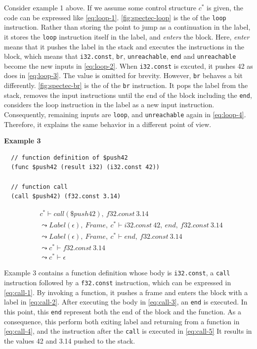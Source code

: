 Consider example 1 above.
If we assume some control structure $c^*$ is given, the code can be expressed
like \cref{eq:loop-1}.
\cref{fig:spectec-loop} is the \spectecp{} of the \texttt{loop} instruction.
Rather than storing the point to jump as a continuation in the label, it stores
the \texttt{loop} instruction itself in the label, and \textit{enters} the
block.
Here, \textit{enter} means that it pushes the label in the stack and executes
the instructions in the block, which means that \texttt{i32.const},
\texttt{br}, \texttt{unreachable}, \texttt{end} and \texttt{unreachable} become
the new inputs in \cref{eq:loop-2}.
When \texttt{i32.const} is excuted, it pushes 42 as \officialp{} does
in \cref{eq:loop-3}.
The value is omitted for brevity.
However, \texttt{br} behaves a bit differently.
\cref{fig:spectec-br} is the \spectecp{} of the \texttt{br} instruction.
It pops the label from the stack, removes the input instructions until the end
of the block including the \texttt{end}, considers the loop instruction in the
label as a new input instruction.
Consequently, remaining inputs are \texttt{loop}, and \texttt{unreachable}
again in \cref{eq:loop-4}.
Therefore, it explains the same behavior in a different point of view.


\textbf{Example 3}
\begin{verbatim}
  // function definition of $push42
  (func $push42 (result i32) (i32.const 42))

  // function call
  (call $push42) (f32.const 3.14)
\end{verbatim}

\begin{align}
  &c^* \vdash call(\$push42), ~ f32.const ~ 3.14 \label{eq:call-1} \\
&\leadsto
  Label(\epsilon), ~ Frame, ~ c^* \vdash i32.const ~ 42, ~ end, ~ f32.const ~ 3.14 \label{eq:call-2} \\
&\leadsto
  Label(\epsilon), ~ Frame, ~ c^* \vdash end, ~ f32.const ~ 3.14 \label{eq:call-3} \\
&\leadsto
  c^* \vdash f32.const ~ 3.14 \label{eq:call-4} \\
&\leadsto
  c^* \vdash \epsilon \label{eq:call-5}
\end{align}

Example 3 contains a function definition whose body is \texttt{i32.const}, a
\texttt{call} instruction followed by a \texttt{f32.const} instruction, which
can be expressed in \cref{eq:call-1}.
By invoking a function, it pushes a frame and enters the block with a label in
\cref{eq:call-2}.
After executing the body in \cref{eq:call-3}, an \texttt{end} is executed.
In this point, this \texttt{end} represent both the end of the block and the
function.
As a consequence, this  perform both exiting label and returning from
a function in \cref{eq:call-4}, and the instruction after the \texttt{call} is
executed in \cref{eq:call-5}
It results in the values 42 and 3.14 pushed to the stack.


